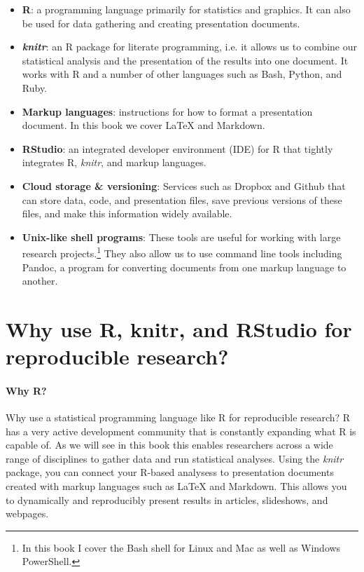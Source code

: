\begin{itemize}
    \item {\bf{R}}: a programming language primarily for statistics and graphics. It can also be used for data gathering and creating presentation documents.
    
    \item {\bf{{\emph{knitr}}}}: an R package for literate programming, i.e. it allows us to combine our statistical analysis and the presentation of the results into one document. It works with R and a number of other languages such as Bash, Python, and Ruby.
    
    \item {\bf{Markup languages}}: instructions for how to format a presentation document. In this book we cover LaTeX and Markdown.  
    
    \item {\bf{RStudio}}: an integrated developer environment (IDE) for R that tightly integrates R, {\emph{knitr}}, and markup languages.
    
    \item {\bf{Cloud storage \& versioning}}: Services such as Dropbox and Github that can store data, code, and presentation files, save previous versions of these files, and make this information widely available.
    
    \item {\bf{Unix-like shell programs}}: These tools are useful for working with large research projects.\footnote{In this book I cover the Bash shell for Linux and Mac as well as Windows PowerShell.} They also allow us to use command line tools including Pandoc, a program for converting documents from one markup language to another.
\end{itemize}


\section{Why use R, knitr, and RStudio for reproducible research?}

\paragraph{Why R?}
Why use a statistical programming language like R \cite[]{RLanguage} for reproducible research? R has a very active development community that is constantly expanding what R is capable of. As we will see in this book this enables researchers across a wide range of disciplines to gather data and run statistical analyses. Using the {\emph{knitr}} package, you can connect your R-based analysess to presentation documents created with markup languages such as LaTeX and Markdown. This allows you to dynamically and reproducibly present results in articles, slideshows, and webpages. 

